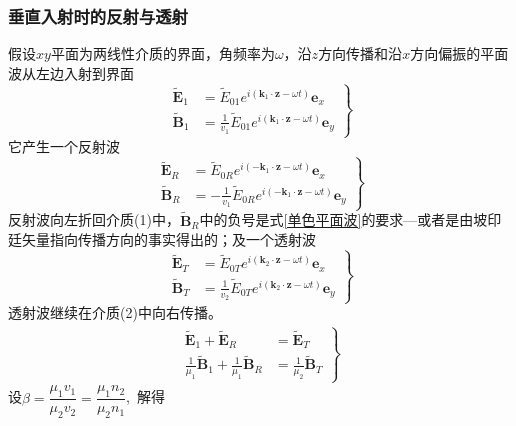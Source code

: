 \subsubsection{垂直入射时的反射与透射}
假设$xy$平面为两线性介质的界面，角频率为$\omega$，沿$z$方向传播和沿$x$方向偏振的平面波从左边入射到界面
\begin{equation}
\left.\begin{aligned}
\widetilde{\boldsymbol{E}}_1 &= \widetilde{E}_{01}e^{i(\boldsymbol k_1\cdot\boldsymbol z-\omega t)}\boldsymbol{e}_x\\
\widetilde{\boldsymbol{B}}_1 &= \frac{1}{v_1}\widetilde{E}_{01}e^{i(\boldsymbol k_1\cdot\boldsymbol z-\omega t)}\boldsymbol{e}_y
\end{aligned}\right\}
\end{equation}
它产生一个反射波
\begin{equation}
\left.\begin{aligned}
\widetilde{\boldsymbol{E}}_R &= \widetilde{E}_{0R}e^{i(-\boldsymbol k_1\cdot\boldsymbol z-\omega t)}\boldsymbol{e}_x\\
\widetilde{\boldsymbol{B}}_R &= -\frac{1}{v_1}\widetilde{E}_{0R}e^{i(-\boldsymbol k_1\cdot\boldsymbol z-\omega t)}\boldsymbol{e}_y
\end{aligned}\right\}
\end{equation}
反射波向左折回介质(1)中，$\widetilde{\boldsymbol{B}}_R$中的负号是式\ref{单色平面波}的要求—或者是由坡印廷矢量指向传播方向的事实得出的；及一个透射波
\begin{equation}
\left.\begin{aligned}
\widetilde{\boldsymbol{E}}_T &= \widetilde{E}_{0T}e^{i(\boldsymbol k_2\cdot\boldsymbol z-\omega t)}\boldsymbol{e}_x\\
\widetilde{\boldsymbol{B}}_T &= \frac{1}{v_2}\widetilde{E}_{0T}e^{i(\boldsymbol k_2\cdot\boldsymbol z-\omega t)}\boldsymbol{e}_y
\end{aligned}\right\}
\end{equation}
透射波继续在介质(2)中向右传播。
\begin{align*}
\left.\begin{aligned}
\widetilde{\boldsymbol{E}}_1+\widetilde{\boldsymbol{E}}_R&= \widetilde{\boldsymbol{E}}_T\\
\frac{1}{\mu_1}\widetilde{\boldsymbol{B}}_1+\frac{1}{\mu_1}\widetilde{\boldsymbol{B}}_R&= \frac{1}{\mu_2}\widetilde{\boldsymbol{B}}_T
\end{aligned}\right\}
\end{align*}
设$\beta=\dfrac{\mu_1v_1}{\mu_2v_2}=\dfrac{\mu_1n_2}{\mu_2n_1}$,\, 解得
